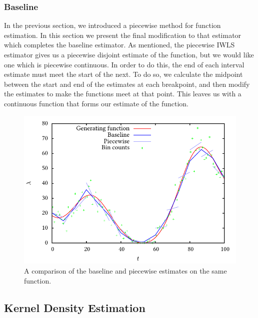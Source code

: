 \documentclass[a4paper,11pt]{article}
\begin{document}
\subsubsection{Baseline}
\label{sec-6-1-4}

    In the previous section, we introduced a piecewise method for function
    estimation. In this section we present the final modification to that estimator
    which completes the baseline estimator. As mentioned, the piecewise IWLS
    estimator gives us a piecewise disjoint estimate of the function, but we would
    like one which is piecewise continuous. In order to do this, the end of each
    interval estimate must meet the start of the next. To do so, we calculate the
    midpoint between the start and end of the estimates at each breakpoint, and then
    modify the estimates to make the functions meet at that point. This leaves us
    with a continuous function that forms our estimate of the function.
    \begin{figure}
    \includegraphics{pcbase}
    \caption{A comparison of the baseline and piecewise estimates on the same
    function.}
    \label{fig:basecomp}
    \end{figure}
\subsection{Kernel Density Estimation}
\label{sec-6-2}
\end{document}

